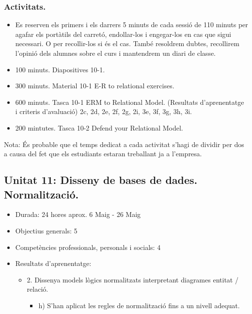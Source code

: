 \documentclass[catalan, a4paper, 12pt, titlepage]{article}
\begin{document}
  \subsubsection{Activitats.}
  \begin{itemize}
          \item Es reserven els primers i els darrers 5 minuts de cada sessió de 110 minuts per agafar els portàtils del carretó, endollar-los i engegar-los en cas que sigui necessari. O per recollir-los si és el cas. També resoldrem dubtes, recollirem l'opinió dels alumnes sobre el curs i mantendrem un diari de classe.
	  \item 100 minuts. Diapositives 10-1.
	  \item 300 minuts. Material 10-1 E-R to relational exercises.
	  \item 600 minuts. Tasca 10-1 ERM to Relational Model. (\faGraduationCap Resultats d'aprenentatge i criteris d'avaluació) 2c, 2d, 2e, 2f, 2g, 2i, 3e, 3f, 3g, 3h, 3i.
	  \item 200 mintutes. Tasca 10-2 Defend your Relational Model.
  \end{itemize}

  Nota: És probable que el temps dedicat a cada activitat s'hagi de dividir per dos a causa del fet que els estudiants estaran treballant ja a l'empresa.

  \subsection{Unitat 11: Disseny de bases de dades. Normalització.}

  \begin{itemize}
	\item Durada: 24 hores aprox. 6 Maig - 26 Maig
	\item Objectius generals: 5
	\item Competències professionals, personals i socials: 4
	\item Resultats d'aprenentatge: 
		\begin{itemize}
			\item 2. Dissenya models lògics normalitzats interpretant diagrames entitat / relació.
				\begin{itemize}
					\item h) S'han aplicat les regles de normalització fins a un nivell adequat.
				\end{itemize}
		\end{itemize}
  \end{itemize}
\end{document}
